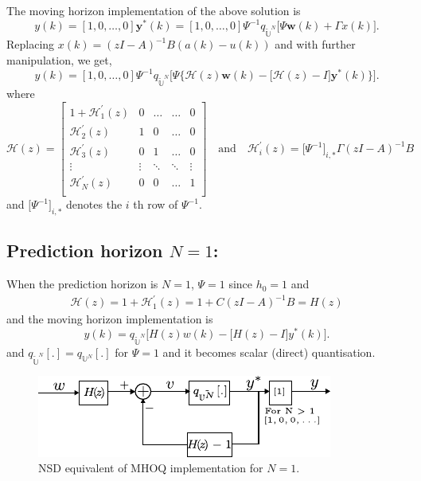 \documentclass[a4paper]{article}
\begin{document}
The moving horizon implementation of the above solution is 
\begin{equation}
	{y}(k) =[1, 0, \ldots, 0]\mathbf{y}^{\ast}(k) = [1, 0, \ldots, 0] \Psi^{-1} q_{\tilde{\mathbb{U}}^{N}} \big[\Psi \mathbf{w}(k) + \Gamma x(k)\big].
\end{equation}
Replacing $x(k) = (zI- A)^{-1}B (a(k) - u(k))$ and with further manipulation, we get, 
\begin{equation}
	{y}(k) =[1, 0, \ldots, 0] \Psi^{-1} q_{\tilde{\mathbb{U}}^{N}} \big[\Psi \bigl\{ \mathcal{H}(z)  \mathbf{w}(k) - \big[ \mathcal{H}(z) -I\big] \mathbf{y}^{\ast}(k)\bigr\} \big].
\end{equation}
where 
\begin{equation}
	\mathcal{H}(z) = \begin{bmatrix}
		1 + \mathcal{H}_{1}^{\prime}(z)	 & 0 &\ldots & \ldots & 0 \\
		\mathcal{H}_{2}^{\prime}(z)	 & 1 & 0 & \ldots & 0 \\
		\mathcal{H}_{3}^{\prime}(z)	 & 0 & 1 & \ldots & 0 \\
		\vdots & \vdots & \ddots & \ddots & \vdots \\
		\mathcal{H}_{N}^{\prime}(z)	 & 0 & 0 & \ldots & 1 \\
	\end{bmatrix}	
	\quad
	\textrm{and}
	\quad
\mathcal{H}_{i}^{\prime}(z) = \big[\Psi^{-1}\big]_{i,\ast} \Gamma(zI- A)^{-1}B
\end{equation}
and $ \big[\Psi^{-1}\big]_{i,\ast}$ denotes the $i$ th row of $\Psi^{-1}$.

\subsection{ Prediction horizon $N = 1$:}
When the prediction horizon is $N = 1$, $\Psi = 1$ since $h_{0}=1$ and  
\begin{align*}
\mathcal{H}(z) = 1 + \mathcal{H}_{1}^{\prime}(z) = 1 + C(zI- A)^{-1}B = H(z)
\end{align*}
and the moving horizon implementation is 
\begin{equation}
	{y}(k) =  q_{\tilde{\mathbb{U}}^{N}} \big[{H}(z)  {w}(k) - \big[ {H}(z) -I\big] {y}^{\ast}(k)\big].
\end{equation}
and $ q_{\tilde{\mathbb{U}}^{N}}[.] = q_{{\mathbb{U}}^{N}}[.]$ for $\Psi = 1$ and it becomes scalar (direct) quantisation.

\begin{figure}[!h]
	\centering
	\includegraphics[scale = 2]{figures/nsd_mhoq_implementation.pdf}
	\caption{NSD equivalent of MHOQ implementation for $N=1$.}
	\label{fig:nsd_mhoq_implementation}
\end{figure}
\end{document}
